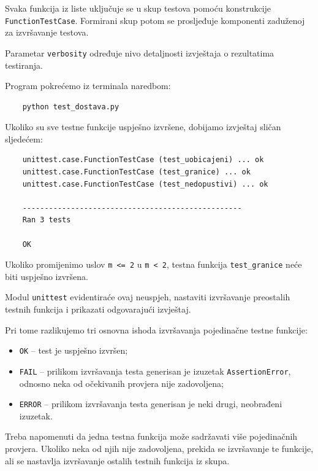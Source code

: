 Svaka funkcija iz liste uključuje se u skup testova 
pomoću konstrukcije \texttt{FunctionTestCase}. 
Formirani skup potom se prosljeđuje komponenti 
zaduženoj za izvršavanje testova.

Parametar \texttt{verbosity} određuje nivo detaljnosti 
izvještaja o rezultatima testiranja.

Program pokrećemo iz terminala naredbom:

\begin{verbatim}
	python test_dostava.py
\end{verbatim}

Ukoliko su sve testne funkcije uspješno izvršene, 
dobijamo izvještaj sličan sljedećem:

\begin{verbatim}
	unittest.case.FunctionTestCase (test_uobicajeni) ... ok
	unittest.case.FunctionTestCase (test_granice) ... ok
	unittest.case.FunctionTestCase (test_nedopustivi) ... ok
	
	--------------------------------------------------
	Ran 3 tests
	
	OK
\end{verbatim}

Ukoliko promijenimo uslov \texttt{m <= 2} u 
\texttt{m < 2}, testna funkcija 
\texttt{test\_granice} neće biti uspješno izvršena.

Modul \texttt{unittest} evidentiraće ovaj neuspjeh, 
nastaviti izvršavanje preostalih testnih funkcija 
i prikazati odgovarajući izvještaj.

Pri tome razlikujemo tri osnovna ishoda izvršavanja 
pojedinačne testne funkcije:

\begin{itemize}
	\item \texttt{OK} -- test je uspješno izvršen;
	
	\item \texttt{FAIL} -- prilikom izvršavanja testa 
	generisan je izuzetak \texttt{AssertionError}, 
	odnosno neka od očekivanih provjera nije 
	zadovoljena;
	
	\item \texttt{ERROR} -- prilikom izvršavanja testa 
	generisan je neki drugi, neobrađeni izuzetak.
\end{itemize}

Treba napomenuti da jedna testna funkcija može 
sadržavati više pojedinačnih provjera. Ukoliko neka 
od njih nije zadovoljena, prekida se izvršavanje 
te funkcije, ali se nastavlja izvršavanje ostalih 
testnih funkcija iz skupa.



